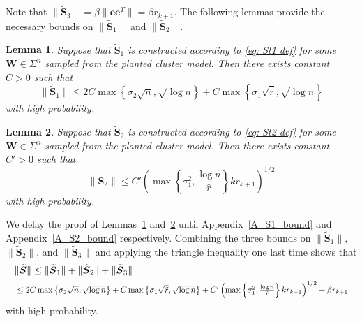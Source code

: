 \documentclass[twoside,11pt]{article}
\newtheorem{lemma}{Lemma}[section]
\newcommand{\St}{\bs{\tilde S}}
\newcommand{\bs}{\boldsymbol}
\newcommand{\W}{\bs {W}}
\newcommand{\0}{\bs{0}}
\newcommand{\rbra}[1]{\ensuremath{\left( #1 \right)}} %
\newcommand{\bra}[1]{\ensuremath{\left\{ #1 \right\}}} %
\begin{document}
{Note that $\|\St_3\| = \beta\|\bs{e}\bs{e}^T\|=\beta r_{k+1}$. 
The following lemmas provide the necessary bounds on $\|\St_1\|$ and $\|\St_2\|$.

\begin{lemma} \label{lem: S1} 
	Suppose that \(\St_1\) is constructed according to \eqref{eq: St1 def}
	for some \(\W\in \Sigma^n\) sampled from the planted cluster model.
	Then there exists constant $C > 0$ such that
	\begin{equation} \label{eq: S1 bound}	
	\|\St_1\| \le 2 C \max\left\lbrace \sigma_2\sqrt{n},  \sqrt{\log n} \right\rbrace 
	+ C \max\left\lbrace \sigma_1\sqrt{ \tilde{r} }, \sqrt{ \log n} \right\rbrace 
	\end{equation}
	with high probability.
\end{lemma}	

\begin{lemma} \label{lem: S2}
	Suppose that \(\St_2\) is constructed according to \eqref{eq: St2 def}
	for some \(\W\in \Sigma^n\) sampled from the planted cluster model.
	Then there exists constant $C'> 0$ such that
	\begin{equation} \label{eq: S2 bound}
		\|\St_2 \| \le C' \rbra{ \max \bra{\sigma_1^2, \frac{\log n}{\hat r} } k r_{k+1} }^{1/2}
	\end{equation}
	with high probability.
\end{lemma}

We delay the proof of Lemmas~\ref{lem: S1} and~\ref{lem: S2} until Appendix~\ref{A_S1_bound}
and Appendix~\ref{A_S2_bound} respectively.
Combining the three bounds on \(\|\St_1\|,\) \(\|\St_2\|\), and \(\|\St_3\|\) and 
applying the triangle inequality one last time shows that
\begin{align*}
&\|\St\| \leq \|\St_1\|+\|\St_2\|+\|\St_3\|  \\
& \resizebox{0.99\textwidth}{!}{
$
\leq  2 C \max\left\lbrace \sigma_2\sqrt{n},  \sqrt{\log n} \right\rbrace 
	+ C \max\left\lbrace \sigma_1\sqrt{ \tilde{r} }, \sqrt{ \log n} \right\rbrace 
+ C' \rbra{ \max \bra{\sigma_1^2, \frac{\log n}{\hat r} } k r_{k+1} }^{1/2} + \beta r_{k+1}
$}
\end{align*}
with high probability.


}
\end{document}
